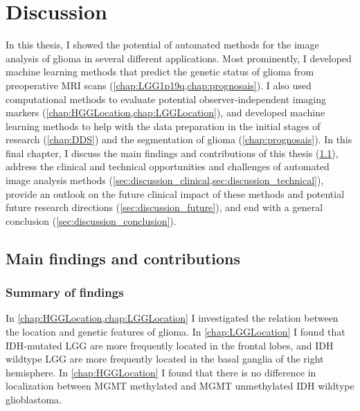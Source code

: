 
\chapter{Discussion}\label{chap:discussion}
\begin{ChapterAbstractNoTitle}
\end{ChapterAbstractNoTitle}
In this thesis, I showed the potential of automated methods for the image analysis of glioma in several different applications.
Most prominently, I developed machine learning methods that predict the genetic status of glioma from preoperative \gls{MRI} scans (\cref{chap:LGG1p19q,chap:prognosais}).
I also used computational methods to evaluate potential observer-independent imaging markers (\cref{chap:HGGLocation,chap:LGGLocation}), and developed machine learning methods to help with the data preparation in the initial stages of research (\cref{chap:DDS}) and the segmentation of glioma (\cref{chap:prognosais}).
In this final chapter, I discuss the main findings and contributions of this thesis (\cref{sec:discussion_main_findings}), address the clinical and technical opportunities and challenges of automated image analysis methods (\cref{sec:discussion_clinical,sec:discussion_technical}), provide an outlook on the future clinical impact of these methods and potential future research directions (\cref{sec:discussion_future}), and end with a general conclusion (\cref{sec:discussion_conclusion}).

\section{Main findings and contributions}\label{sec:discussion_main_findings}

\subsection{Summary of findings}

In \cref{chap:HGGLocation,chap:LGGLocation} I investigated the relation between the location and genetic features of \gls{glioma}.
In \cref{chap:LGGLocation} I found that \gls{IDH}-mutated \gls{LGG} are more frequently located in the frontal lobes, and \gls{IDH} wildtype \gls{LGG} are more frequently located in the basal ganglia of the right hemisphere.
In \cref{chap:HGGLocation} I found that there is no difference in localization between \gls{MGMT} methylated and \gls{MGMT} unmethylated \gls{IDH} wildtype glioblastoma.


